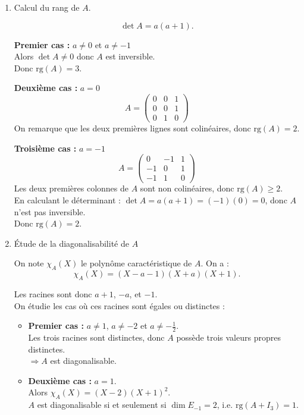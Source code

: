 \documentclass[a4paper,12pt,oneside]{book}
\newenvironment{solution}{\begin{solutionbox}}{\end{solutionbox}}
\begin{document}
\begin{solution}
	\begin{enumerate}
		\item Calcul du rang de \( A \).
		
		\[
		\det A = a(a+1).
		\]
		
		\textbf{Premier cas :} \(a \neq 0\) et \(a \neq -1\)\\
		Alors \(\det A \neq 0\) donc \(A\) est inversible.\\
		Donc \(\mathrm{rg}(A) = 3\).
		
		\textbf{Deuxième cas :} \(a = 0\)
		\[
		A = \begin{pmatrix}
			0 & 0 & 1 \\
			0 & 0 & 1 \\
			0 & 1 & 0
		\end{pmatrix}
		\]
		On remarque que les deux premières lignes sont colinéaires, donc \(\mathrm{rg}(A) = 2\).
		
		\textbf{Troisième cas :} \(a = -1\)
		\[
		A = \begin{pmatrix}
			0 & -1 & 1 \\
			-1 & 0 & 1 \\
			-1 & 1 & 0
		\end{pmatrix}
		\]
		Les deux premières colonnes de \(A\) sont non colinéaires, donc \(\mathrm{rg}(A) \geq 2\).\\
		En calculant le déterminant : \(\det A = a(a+1) = (-1)(0) = 0\), donc \(A\) n'est pas inversible.\\
		Donc \(\mathrm{rg}(A) = 2\).
		
		\item Étude de la diagonalisabilité de \( A \)
		
		On note \(\chi_A(X)\) le polynôme caractéristique de \(A\). On a :
		\[
		\chi_A(X) = (X - a - 1)(X + a)(X + 1).
		\]
		
		Les racines sont donc \(a+1\), \(-a\), et \(-1\).\\
		On étudie les cas où ces racines sont égales ou distinctes :
		
		\begin{itemize}
			\item \textbf{Premier cas :} \(a \neq 1\), \(a \neq -2\) et \(a \neq -\frac{1}{2}\).\\
			Les trois racines sont distinctes, donc \(A\) possède trois valeurs propres distinctes.\\
			\(\Rightarrow A\) est diagonalisable.
			
			\item \textbf{Deuxième cas :} \(a = 1\).\\
			Alors \(\chi_A(X) = (X - 2)(X + 1)^2\).\\
			\(A\) est diagonalisable si et seulement si \(\dim E_{-1} = 2\), i.e. \(\mathrm{rg}(A + I_3) = 1\).
			

\end{itemize}
\end{enumerate}
\end{solution}
\end{document}
